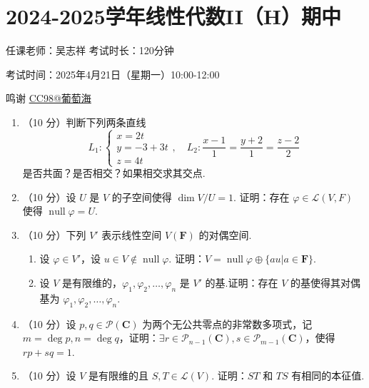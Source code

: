 \section{2024-2025学年线性代数II（H）期中}

\begin{center}
    任课老师：吴志祥\hspace{4em} 考试时长：120分钟

    考试时间：2025年4月21日（星期一）10:00-12:00

    鸣谢 \href{https://www.cc98.org/topic/6169816}{CC98@葡萄海}
\end{center}

\begin{enumerate}
    \item （10 分）判断下列两条直线
        \[ L_1\colon\begin{cases}
            x=2t \\ y=-3+3t \\ z=4t
        \end{cases}, \quad L_2\colon\frac{x-1}{1}=\frac{y+2}{1}=\frac{z-2}{2}\]
        是否共面？是否相交？如果相交求其交点.

    \item （10 分）设 \(U\) 是 \(V\) 的子空间使得 \(\dim V/U = 1\). 证明：存在 \(\varphi \in \mathcal{L}(V,F)\) 使得 \(\operatorname{null} \varphi = U \).

    \item （10 分）下列 \(V'\) 表示线性空间 \(V(\mathbf{F})\) 的对偶空间.
    \begin{enumerate}
        \item 设 \(\varphi\in V'\)，设 \(u\in V \notin \operatorname{null}\varphi\). 证明：\(V=\operatorname{null}\varphi\oplus\{au|a\in\mathbf{F}\}\).

        \item 设 \(V\) 是有限维的，\(\varphi_1,\varphi_2,\ldots,\varphi_n\) 是 \(V'\) 的基.证明：存在 \(V\) 的基使得其对偶基为 \(\varphi_1,\varphi_2,\ldots,\varphi_n\).
    \end{enumerate}

    \item （10 分）设 \(p,q\in \mathcal{P}(\mathbf{C})\) 为两个无公共零点的非常数多项式，记 \(m =\deg p, n = \deg q\)，证明：\(\exists r \in \mathcal{P}_{n-1}(\mathbf{C}), s \in \mathcal{P}_{m-1}(\mathbf{C})\)，使得 \(rp+sq=1\).

    \item （10 分）设 \(V\) 是有限维的且 \(S,T\in \mathcal{L}(V)\). 证明：\(ST\) 和 \(TS\) 有相同的本征值.


\end{enumerate}
